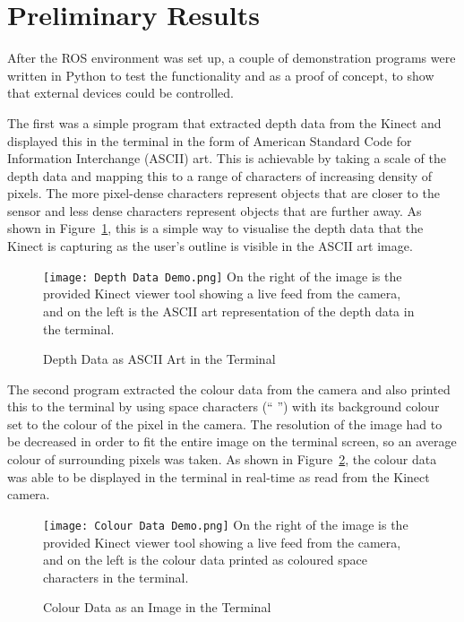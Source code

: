 \newpage

\section{Preliminary Results}

After the ROS environment was set up, a couple of demonstration programs were written in Python to test the functionality and as a proof of concept, to show that external devices could be controlled.

The first was a simple program that extracted depth data from the Kinect and displayed this in the terminal in the form of American Standard Code for Information Interchange (ASCII) art.
This is achievable by taking a scale of the depth data and mapping this to a range of characters of increasing density of pixels.
The more pixel-dense characters represent objects that are closer to the sensor and less dense characters represent objects that are further away.
As shown in Figure~\ref{fig:depth_ascii}, this is a simple way to visualise the depth data that the Kinect is capturing as the user's outline is visible in the ASCII art image.

\begin{figure}[!htb]
    \caption{Depth Data as ASCII Art in the Terminal}
    \texttt{[image: Depth Data Demo.png]}
    \small
    On the right of the image is the provided Kinect viewer tool showing a live feed from the camera, and on the left is the ASCII art representation of the depth data in the terminal.
    \label{fig:depth_ascii}
\end{figure}

The second program extracted the colour data from the camera and also printed this to the terminal by using space characters (`` '') with its background colour set to the colour of the pixel in the camera.
The resolution of the image had to be decreased in order to fit the entire image on the terminal screen, so an average colour of surrounding pixels was taken.
As shown in Figure~\ref{fig:colour_image}, the colour data was able to be displayed in the terminal in real-time as read from the Kinect camera.

\begin{figure}[!htb]
    \caption{Colour Data as an Image in the Terminal}
    \texttt{[image: Colour Data Demo.png]}
    \small
    On the right of the image is the provided Kinect viewer tool showing a live feed from the camera, and on the left is the colour data printed as coloured space characters in the terminal.
    \label{fig:colour_image}
\end{figure}

